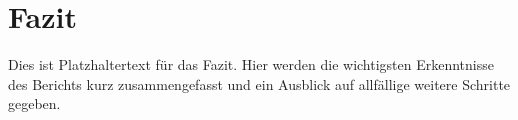 \section{Fazit}
\label{sec:fazit}

Dies ist Platzhaltertext für das Fazit. Hier werden die wichtigsten Erkenntnisse des
Berichts kurz zusammengefasst und ein Ausblick auf allfällige weitere Schritte gegeben.
